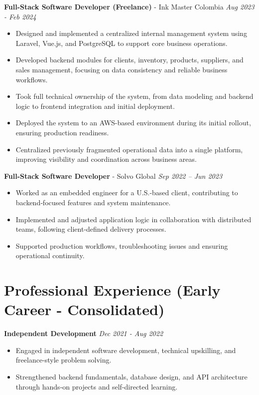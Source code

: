 \documentclass[9pt,letterpaper]{extarticle}
\begin{document}
	\textbf{Full-Stack Software Developer (Freelance)} - {Ink Master Colombia}
	\hfill \textit{Aug 2023 - Feb 2024}
	\begin{itemize}
		\item Designed and implemented a centralized internal management system using Laravel, Vue.js, and PostgreSQL to support core business operations.
		\item Developed backend modules for clients, inventory, products, suppliers, and sales management, focusing on data consistency and reliable business workflows.
		\item Took full technical ownership of the system, from data modeling and backend logic to frontend integration and initial deployment.
		\item Deployed the system to an AWS-based environment during its initial rollout, ensuring production readiness.
		\item Centralized previously fragmented operational data into a single platform, improving visibility and coordination across business areas.
	\end{itemize}

	\textbf{Full-Stack Software Developer} - {Solvo Global}
	\hfill \textit{Sep 2022 – Jun 2023}
	\begin{itemize}
		\item Worked as an embedded engineer for a U.S.‑based client, contributing to backend‑focused features and system maintenance.
		\item Implemented and adjusted application logic in collaboration with distributed teams, following client‑defined delivery processes.
		\item Supported production workflows, troubleshooting issues and ensuring operational continuity.
	\end{itemize}
	
	\section*{Professional Experience (Early Career - Consolidated)}
	
	\textbf{Independent Development}
	\hfill \textit{Dec 2021 - Aug 2022}
	\begin{itemize}
		\item Engaged in independent software development, technical upskilling, and freelance‑style problem solving.
		\item Strengthened backend fundamentals, database design, and API architecture through hands‑on projects and self‑directed learning.
	\end{itemize}
	
\end{document}
